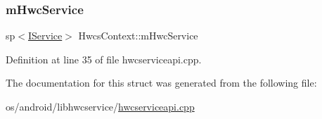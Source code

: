 \subsubsection{\texorpdfstring{m\+Hwc\+Service}{mHwcService}}
{\footnotesize\ttfamily sp$<$\mbox{\hyperlink{classhwcomposer_1_1IService}{I\+Service}}$>$ Hwcs\+Context\+::m\+Hwc\+Service}



Definition at line 35 of file hwcserviceapi.\+cpp.



The documentation for this struct was generated from the following file\+:\begin{DoxyCompactItemize}
\item 
os/android/libhwcservice/\mbox{\hyperlink{hwcserviceapi_8cpp}{hwcserviceapi.\+cpp}}\end{DoxyCompactItemize}
